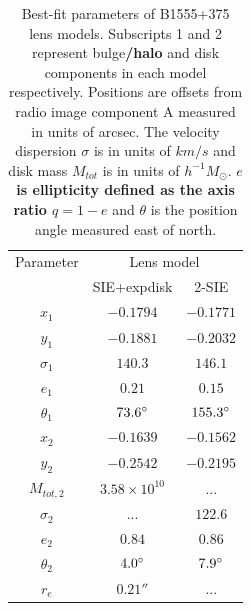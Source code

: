 \documentclass[useAMS,usenatbib]{mn2e}
\begin{document}
\begin{table}
  \caption{Best-fit parameters of B1555+375 lens models. Subscripts 1 and 2 represent bulge\textbf{/halo} and disk components in each model respectively. Positions are offsets from radio image component A measured in units of arcsec. The velocity dispersion $\sigma$ is in units of $km/s$ and disk mass $M_{tot}$ is in units of $h^{-1} M_{\odot}$. \textbf{$e$ is ellipticity defined as the axis ratio $q=1-e$ }and $\theta$ is the position angle measured east of north.}
  \begin{tabular}{@{}ccc}
\hline 
 Parameter  & \multicolumn{2}{c}{Lens model} \\
		&SIE+expdisk& 2-SIE		   
\\
\hline
$x_1$  	  & $-0.1794$	& $-0.1771$  \\
$y_1$	  &$-0.1881$	&$-0.2032$  \\

$\sigma_1$ &$140.3$     & $146.1$ \\
$e_1$	  & $0.21$	& $0.15$ \\
$\theta_1$ &$73.6 \hbox{$^\circ$}$ & $155.3 \hbox{$^\circ$}$ \\
\hline
$x_2$	  &$-0.1639$ 	&$-0.1562$  \\
$y_2$	  &$-0.2542$	& $-0.2195$  \\
$M_{tot,2}$  & $3.58\times 10^{10} $  & ...	 \\  
$\sigma_2$ & ...        &$122.6$ \\  
$e_2$	  &$0.84$	&$0.86$  \\
$\theta_2$ &$4.0\hbox{$^\circ$}$ &$7.9\hbox{$^\circ$}$  \\
$r_e$	  & $0.21 ''$ &  ... \\
\hline
\end{tabular}




\end{table}
\end{document}
